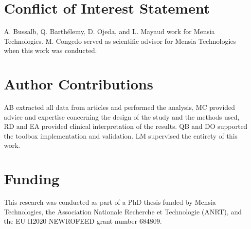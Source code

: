 
\section*{Conflict of Interest Statement}
A. Bussalb, Q. Barth\'elemy, D. Ojeda, and L. Mayaud work for Mensia Technologies.
M. Congedo served as scientific advisor for Mensia Technologies when this work was conducted.  

\section*{Author Contributions}
AB extracted all data from articles and performed the analysis, MC provided advice and expertise
concerning the design of the study and the methods used, RD and EA 
provided clinical interpretation of the results. QB and DO supported the toolbox implementation
and validation. LM supervised the entirety of this work. 

\section*{Funding}
This research was conducted as part of a PhD thesis funded by Mensia Technologies, the 
Association Nationale Recherche et Technologie (ANRT), and the EU H2020 NEWROFEED grant number 684809.


